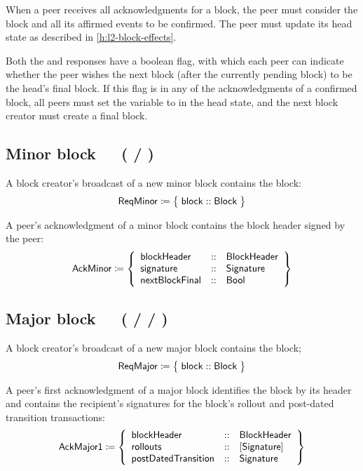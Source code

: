 \documentclass[../hydrozoa.tex]{subfiles}
\begin{document}
When a peer receives all acknowledgments for a block, the peer must consider the block and all its affirmed events to be confirmed.
The peer must update its head state as described in \cref{h:l2-block-effects}.

Both the  and  responses have a  boolean flag, with which each peer can indicate whether the peer wishes the next block (after the currently pending block) to be the head's final block.
If this flag is  in any of the acknowledgments of a confirmed block, all peers must set the  variable to  in the head state, and the next block creator must create a final block.
\subsection{Minor block~~~( / )}%
\label{h:l2-consensus-minor-block}%

A block creator's broadcast of a new minor block contains the block:
\begin{equation*}
  \mathsf{ReqMinor} \coloneq \;\bigr\{\; \mathsf{block} :: \mathsf{Block} \;\bigr\}
\end{equation*}

A peer's acknowledgment of a minor block contains the block header signed by the peer:
\begin{equation*}
  \mathsf{AckMinor} \coloneq \left\{
  \begin{array}{lll}
    \mathsf{blockHeader} &::& \mathsf{BlockHeader} \\
    \mathsf{signature} &::& \mathsf{Signature} \\
    \mathsf{nextBlockFinal} &::& \mathsf{Bool}
  \end{array}\right\}
\end{equation*}

\subsection{Major block~~~( /  / )}%
\label{h:l2-consensus-major-block}%

A block creator's broadcast of a new major block contains the block;
\begin{equation*}
  \mathsf{ReqMajor} \coloneq \;\bigr\{\; \mathsf{block} :: \mathsf{Block} \;\bigr\}
\end{equation*}

A peer's first acknowledgment of a major block identifies the block by its header and contains the recipient's signatures for the block's rollout and post-dated transition transactions:
\begin{equation*}
  \mathsf{AckMajor1} \coloneq \left\{
  \begin{array}{lll}
    \mathsf{blockHeader} &::& \mathsf{BlockHeader} \\
    \mathsf{rollouts} &::& [\mathsf{Signature}] \\
    \mathsf{postDatedTransition} &::& \mathsf{Signature}
  \end{array}\right\}
\end{equation*}
\end{document}
